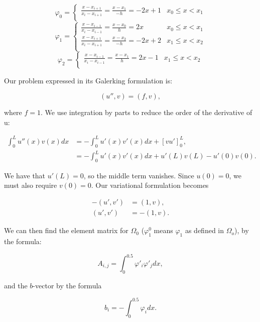 \documentclass[10pt, a4paper]{amsart}
\numberwithin{figure}{section}
\numberwithin{table}{section}
\begin{document}
\[
    \varphi_0 =
    \begin{cases}
        \frac{x - x_{i+1}}{x_i - x_{i+1}} = \frac{x - x_1}{-h} = -2x + 1 & x_0 \leq x
        < x_1 \\
    \end{cases}
\]
\[
    \varphi_1 =
    \begin{cases}
        \frac{x - x_{i-1}}{x_i - x_{i-1}} = \frac{x - x_0}{h} = 2x & x_0 \leq x
        < x_1 \\
        \frac{x - x_{i+1}}{x_i - x_{i+1}} = \frac{x - x_2}{-h} = -2x + 2 & x_1
        \leq x < x_2 \\
    \end{cases}
\]
\[
    \varphi_2 =
    \begin{cases}
        \frac{x - x_{i-1}}{x_i - x_{i-1}} = \frac{x - x_1}{h} = 2x - 1 & x_1
        \leq x < x_2 \\
    \end{cases}
\]

Our problem expressed in its Galerking formulation is:

\begin{equation}
    (u'', v) = (f, v),
\end{equation}

where $f=1$. We use integration by parts to reduce the order of the derivative
of u:

\begin{align}
    \int_0^L u''(x)v(x) dx &= -\int_0^L u'(x) v'(x) dx + [vu']_0^L,\\
    &= -\int_0^L u'(x) v'(x) dx + u'(L)v(L) - u'(0)v(0).
\end{align}

We have that $u'(L) = 0$, so the middle term vanishes. Since $u(0)=0$, we must
also require $v(0)=0$. Our variational formulation becomes

\begin{align}
    - (u', v') &= (1, v),\\
    (u', v') &= - (1, v).
\end{align}


We can then find the element matrix for $\Omega_0$ ($\varphi^0_1$ means
$\varphi_1$ as defined in $\Omega_o$), by the formula:

\begin{equation}
    A_{i,j} = \int_0^{0.5} \varphi'_i \varphi'_j dx,
\end{equation}

and the $b$-vector by the formula

\begin{equation}
    b_i = - \int_0^{0.5} \varphi_i dx.
\end{equation}
\end{document}
